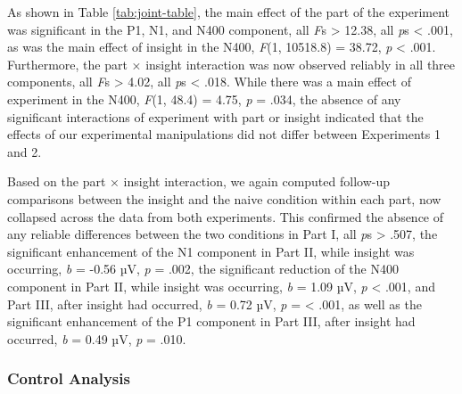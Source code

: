 \documentclass[
  english,
  man,11pt,floatsintext]{apa7}
\begin{document}
As shown in Table \ref{tab:joint-table}, the main effect of the part of the experiment was significant in the P1, N1, and N400 component, all \emph{F}s \textgreater{} 12.38, all \emph{p}s \textless{} .001, as was the main effect of insight in the N400, \emph{F}(1, 10518.8) = 38.72, \emph{p} \textless{} .001. Furthermore, the part × insight interaction was now observed reliably in all three components, all \emph{F}s \textgreater{} 4.02, all \emph{p}s \textless{} .018. While there was a main effect of experiment in the N400, \emph{F}(1, 48.4) = 4.75, \emph{p} = .034, the absence of any significant interactions of experiment with part or insight indicated that the effects of our experimental manipulations did not differ between Experiments 1 and 2.

Based on the part × insight interaction, we again computed follow-up comparisons between the insight and the naive condition within each part, now collapsed across the data from both experiments. This confirmed the absence of any reliable differences between the two conditions in Part I, all \emph{p}s \textgreater{} .507, the significant enhancement of the N1 component in Part II, while insight was occurring, \emph{b} = -0.56 µV, \emph{p} = .002, the significant reduction of the N400 component in Part II, while insight was occurring, \emph{b} = 1.09 µV, \emph{p} \textless{} .001, and Part III, after insight had occurred, \emph{b} = 0.72 µV, \emph{p} = \textless{} .001, as well as the significant enhancement of the P1 component in Part III, after insight had occurred, \emph{b} = 0.49 µV, \emph{p} = .010.

\hypertarget{control-analysis}{%
\subsubsection{Control Analysis}\label{control-analysis}}
\end{document}
